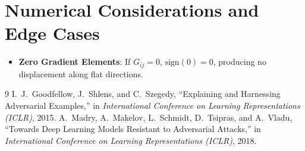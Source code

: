 \documentclass[11pt,a4paper]{article}
\theoremstyle{definition}
\begin{document}
\section{Numerical Considerations and Edge Cases}

\begin{itemize}
    \item \textbf{Zero Gradient Elements}: If $G_{ij} = 0$, $\text{sign}(0) = 0$, producing no displacement along flat directions.
\end{itemize}

\begin{thebibliography}{9}
 I.~J.~Goodfellow, J.~Shlens, and C.~Szegedy, ``Explaining and Harnessing Adversarial Examples,'' in \emph{International Conference on Learning Representations (ICLR)}, 2015.
 A.~Madry, A.~Makelov, L.~Schmidt, D.~Tsipras, and A.~Vladu, ``Towards Deep Learning Models Resistant to Adversarial Attacks,'' in \emph{International Conference on Learning Representations (ICLR)}, 2018.
\end{thebibliography}
\end{document}
